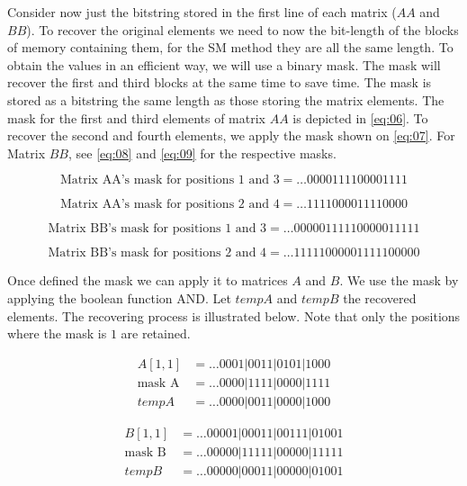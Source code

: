 \documentclass[10pt]{article}
\begin{document}
Consider now just the bitstring stored in the first line of each matrix ($AA$
and $BB$). To recover the original elements we need to now the bit-length of
the blocks of memory containing them, for the SM method they are all the same
length. To obtain the values in an efficient way, we will use a binary mask.
The mask will recover the first and third blocks at the same time to save time.
The mask is stored as a bitstring the same length as those storing the matrix
elements. The mask for the first and third elements of matrix $AA$ is depicted
in \ref{eq:06}. To recover the second and fourth elements, we apply the mask
shown on \ref{eq:07}. For Matrix $BB$, see \ref{eq:08} and \ref{eq:09} for the
respective masks.

\begin{equation}\label{eq:06}
\text{Matrix AA's mask for positions 1 and 3} = \ldots0000111100001111
\end{equation}

\begin{equation}\label{eq:07}
\text{Matrix AA's mask for positions 2 and 4} = \ldots1111000011110000
\end{equation}

\begin{equation}\label{eq:08}
\text{Matrix BB's mask for positions 1 and 3} = \ldots00000111110000011111
\end{equation}

\begin{equation}\label{eq:09}
\text{Matrix BB's mask for positions 2 and 4} = \ldots11111000001111100000
\end{equation}

Once defined the mask we can apply it to matrices $A$ and $B$. We use the mask
by applying the boolean function AND. Let $tempA$ and $tempB$ the recovered
elements. The recovering process is illustrated below. Note that only the
positions where the mask is $1$ are retained.

  \begin{align*}
   A[1,1]		&=	\ldots0001|0011|0101|1000\\
   \text{mask A}	&=	\ldots0000|1111|0000|1111\\
   tempA 		&=	\ldots0000|0011|0000|1000
  \end{align*}

  \begin{align*}
   B[1,1]		&= \ldots00001|00011|00111|01001 \\
   \text{mask B}	&= \ldots00000|11111|00000|11111 \\
   tempB 		&= \ldots00000|00011|00000|01001
  \end{align*}
\end{document}
